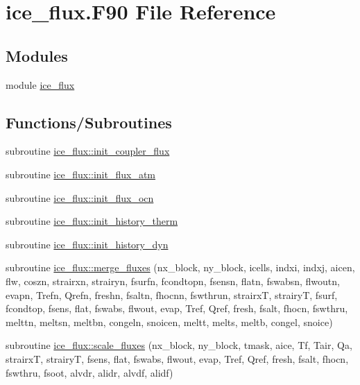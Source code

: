\hypertarget{ice__flux_8F90}{
\section{ice\_\-flux.F90 File Reference}
\label{ice__flux_8F90}
}
\subsection*{Modules}
\begin{DoxyCompactItemize}
\item 
module \hyperlink{namespaceice__flux}{ice\_\-flux}
\end{DoxyCompactItemize}
\subsection*{Functions/Subroutines}
\begin{DoxyCompactItemize}
\item 
subroutine \hyperlink{namespaceice__flux_ac74f9f7368cb2f65428e77204441ef67}{ice\_\-flux::init\_\-coupler\_\-flux}
\item 
subroutine \hyperlink{namespaceice__flux_aa03a1e25e4227bda9639c5a178891acd}{ice\_\-flux::init\_\-flux\_\-atm}
\item 
subroutine \hyperlink{namespaceice__flux_a985af4afe9ebb697857f3f5eaf714545}{ice\_\-flux::init\_\-flux\_\-ocn}
\item 
subroutine \hyperlink{namespaceice__flux_a510c385b0536089d8f4a00ff9c3701cb}{ice\_\-flux::init\_\-history\_\-therm}
\item 
subroutine \hyperlink{namespaceice__flux_adf87450fd972c99fd3d0d4514df29fa9}{ice\_\-flux::init\_\-history\_\-dyn}
\item 
subroutine \hyperlink{namespaceice__flux_aef9c3629a862eb2f134c9aa6b7935acc}{ice\_\-flux::merge\_\-fluxes} (nx\_\-block, ny\_\-block, icells, indxi, indxj, aicen, flw, coszn, strairxn, strairyn, fsurfn, fcondtopn, fsensn, flatn, fswabsn, flwoutn, evapn, Trefn, Qrefn, freshn, fsaltn, fhocnn, fswthrun, strairxT, strairyT, fsurf, fcondtop, fsens, flat, fswabs, flwout, evap, Tref, Qref, fresh, fsalt, fhocn, fswthru, melttn, meltsn, meltbn, congeln, snoicen, meltt, melts, meltb, congel, snoice)
\item 
subroutine \hyperlink{namespaceice__flux_a66344c677dd9f73743df68dcf3d203d9}{ice\_\-flux::scale\_\-fluxes} (nx\_\-block, ny\_\-block, tmask, aice, Tf, Tair, Qa, strairxT, strairyT, fsens, flat, fswabs, flwout, evap, Tref, Qref, fresh, fsalt, fhocn, fswthru, fsoot, alvdr, alidr, alvdf, alidf)
\end{DoxyCompactItemize}
